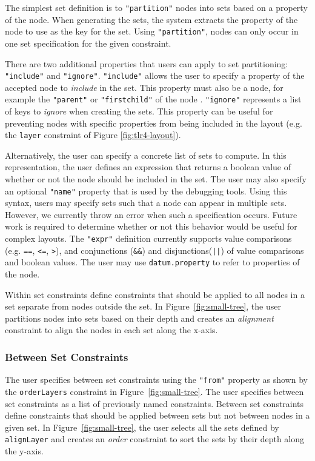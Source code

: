 The simplest set definition is to \texttt{"partition"} nodes into sets based on a property of the node. When generating the sets, the system extracts the property of the node to use as the key for the set. Using \texttt{"partition"}, nodes can only occur in one set specification for the given constraint.

There are two additional properties that users can apply to set partitioning: \texttt{"include"} and \texttt{"ignore"}. \texttt{"include"} allows the user to specify a property of the accepted node to \emph{include} in the set. This property must also be a node, for example the \texttt{"parent"} or \texttt{"firstchild"} of the node . \texttt{"ignore"} represents a list of keys to \emph{ignore} when creating the sets. This property can be useful for preventing nodes with specific properties from being included in the layout (e.g. the \texttt{layer} constraint of Figure \ref{fig:tlr4-layout}).

Alternatively, the user can specify a concrete list of sets to compute. In this representation, the user defines an expression that returns a boolean value of whether or not the node should be included in the set. The user may also specify an optional \texttt{"name"} property that is used by the debugging tools. Using this syntax, users may specify sets such that a node can appear in multiple sets. However, we currently throw an error when such a specification occurs. Future work is required to determine whether or not this behavior would be useful for complex layouts. The \texttt{"expr"} definition currently supports value comparisons (e.g. \texttt{==}, \texttt{<=}, \texttt{>}), and conjunctions (\texttt{\&\&}) and disjunctions(\texttt{||}) of value comparisons and boolean values. The user may use \texttt{datum.property} to refer to properties of the node.

Within set constraints define constraints that should be applied to all nodes in a set separate from nodes outside the set. In Figure~\ref{fig:small-tree}, the user partitions nodes into sets based on their depth and creates an \emph{alignment} constraint to align the nodes in each set along the x-axis.

\subsubsection{Between Set Constraints}
The user specifies between set constraints using the \texttt{"from"} property as shown by the \texttt{orderLayers} constraint in Figure~\ref{fig:small-tree}. The user specifies between set constraints as a list of previously named constraints. Between set constraints define constraints that should be applied between sets but not between nodes in a given set. In Figure~\ref{fig:small-tree}, the user selects all the sets defined by \texttt{alignLayer} and creates an \emph{order} constraint to sort the sets by their depth along the y-axis.


